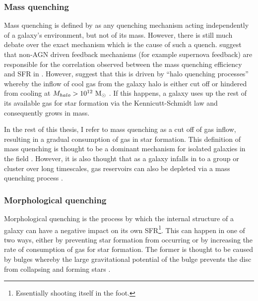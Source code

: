 \subsubsection{Mass quenching}\label{sec:massquench}

Mass quenching is defined by \citet{peng10, peng12} as any quenching mechanism acting independently of a galaxy's environment, but not of its mass. However, there is still much debate over the exact mechanism which is the cause of such a quench. \citet{darvish16} suggest that non-AGN driven feedback mechanisms (for example supernova feedback) are responsible for the correlation observed between the mass quenching efficiency and SFR in \citet{peng10}. However, \citet{gabor15} suggest that this is driven by ``halo quenching processes'' whereby the inflow of cool gas from the galaxy halo is either cut off or hindered from cooling at $M_{halo} > 10^{12}~\rm{M}_{\odot}$ \citep{birnboim03, dekel06}. If this happens, a galaxy uses up the rest of its available gas for star formation via the Kennicutt-Schmidt law \citep{schmidt59, kennicutt98} and consequently grows in mass.

In the rest of this thesis, I refer to mass quenching as a cut off of gas inflow, resulting in a gradual consumption of gas in star formation. This definition of mass quenching is thought to be a dominant mechanism for isolated galaxies in the field \citep{kormendy04}. However, it is also thought that as a galaxy infalls in to a group or cluster over long timescales, gas reservoirs can also be depleted via a mass quenching process \citep{peng12}. 

 
\subsubsection{Morphological quenching}\label{sec:morphquench}

Morphological quenching is the process by which the internal structure of a galaxy can have a negative impact on its own SFR\footnote{Essentially shooting itself in the foot.}. This can happen in one of two ways, either by preventing star formation from occurring or by increasing the rate of consumption of gas for star formation. The former is {\minor thought} to be caused by bulges \citep{bluck14} whereby the large gravitational potential of the bulge prevents the disc from collapsing and forming stars \citep{Fang13}. 

